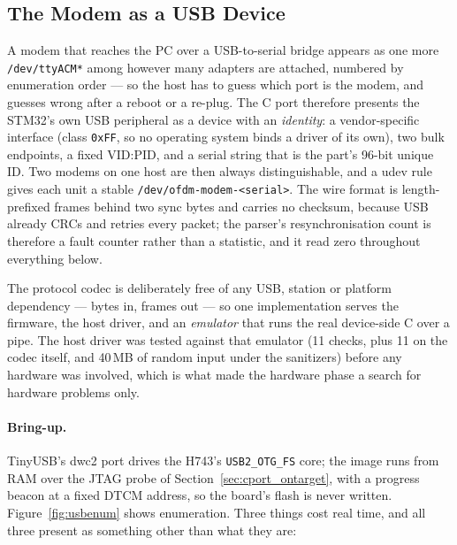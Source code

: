 \subsection{The Modem as a USB Device}
\label{sec:cport_usb}

A modem that reaches the PC over a USB-to-serial bridge appears as one
more \texttt{/dev/ttyACM*} among however many adapters are attached,
numbered by enumeration order --- so the host has to guess which port is
the modem, and guesses wrong after a reboot or a re-plug. The C port
therefore presents the STM32's own USB peripheral as a device with an
\emph{identity}: a vendor-specific interface (class \texttt{0xFF}, so no
operating system binds a driver of its own), two bulk endpoints, a fixed
VID:PID, and a serial string that is the part's 96-bit unique ID. Two
modems on one host are then always distinguishable, and a udev rule
gives each unit a stable \texttt{/dev/ofdm-modem-<serial>}. The wire
format is length-prefixed frames behind two sync bytes and carries no
checksum, because USB already CRCs and retries every packet; the
parser's resynchronisation count is therefore a fault counter rather
than a statistic, and it read zero throughout everything below.

The protocol codec is deliberately free of any USB, station or platform
dependency --- bytes in, frames out --- so one implementation serves the
firmware, the host driver, and an \emph{emulator} that runs the real
device-side C over a pipe. The host driver was tested against that
emulator (11 checks, plus 11 on the codec itself, and 40\,MB of random
input under the sanitizers) before any hardware was involved, which is
what made the hardware phase a search for hardware problems only.

\paragraph{Bring-up.} TinyUSB's dwc2 port drives the H743's
\texttt{USB2\_OTG\_FS} core; the image runs from RAM over the JTAG probe
of Section~\ref{sec:cport_ontarget}, with a progress beacon at a fixed
DTCM address, so the board's flash is never written. Figure~\ref{fig:usbenum}
shows enumeration. Three things cost real time, and all three present as
something other than what they are:

